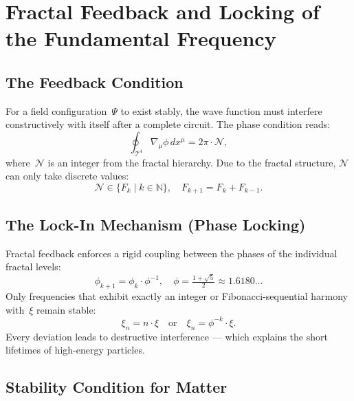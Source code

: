 \section{Fractal Feedback and Locking of the Fundamental Frequency}

\subsection{The Feedback Condition}

For a field configuration~$\Psi$ to exist stably, the wave function
must interfere constructively with itself after a complete circuit.
The phase condition reads:
\begin{equation}
  \oint_{\mathcal{T}^4} \nabla_{\mu}\phi\,dx^\mu = 2\pi\cdot\mathcal{N},
\end{equation}
where~$\mathcal{N}$ is an integer from the fractal hierarchy.
Due to the fractal structure, $\mathcal{N}$ can only take discrete
values:
\begin{equation}
  \mathcal{N} \in \{F_k \mid k \in \mathbb{N}\},\quad
  F_{k+1} = F_k + F_{k-1}.
\end{equation}

\subsection{The Lock-In Mechanism (Phase Locking)}

Fractal feedback enforces a rigid coupling between the phases of the
individual fractal levels:
\begin{equation}
  \phi_{k+1} = \phi_k \cdot \phi^{-1}, \quad
  \phi = \tfrac{1+\sqrt{5}}{2} \approx 1.6180\ldots
\end{equation}
Only frequencies that exhibit exactly an integer or Fibonacci-sequential
harmony with~$\xi$ remain stable:
\begin{equation}
  \xi_n = n \cdot \xi \quad \text{or} \quad \xi_n = \phi^{-k}\cdot\xi.
\end{equation}
Every deviation leads to destructive interference — which explains the
short lifetimes of high-energy particles.

\subsection{Stability Condition for Matter}

